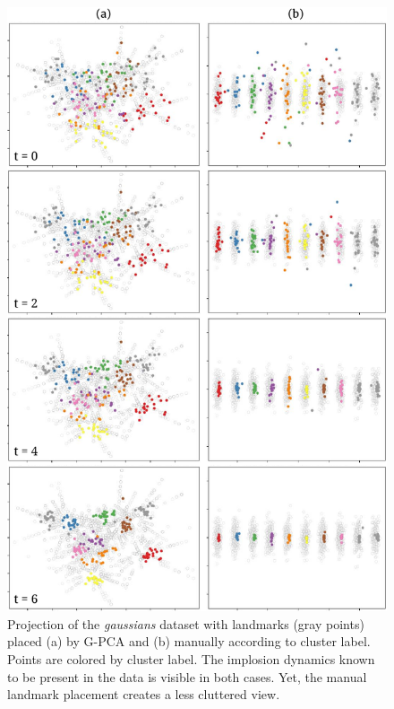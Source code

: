 \begin{figure}[h]\centering
 \includegraphics[width=0.95\linewidth]{figures/projection-algorithm/landmark-placement.pdf}
 \caption{Projection of the \emph{gaussians} dataset with landmarks (gray points) placed (a) by G-PCA and (b) manually according to cluster label. Points are colored by cluster label. The implosion dynamics known to be present in the data is visible in both cases. Yet, the manual landmark placement creates a less cluttered view.}
 \label{fig:landmark-placement}
 \vspace{-0.5cm}
\end{figure}




